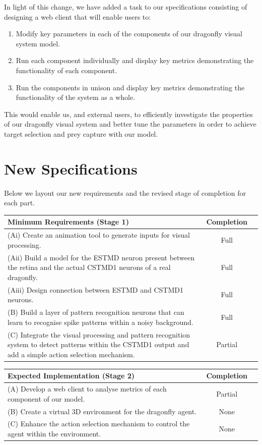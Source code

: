 \documentclass[a4paper,11pt]{article}
\begin{document}
In light of this change, we have added a task to our specifications consisting of designing a web client that will enable users to:
\begin{enumerate}
	\item Modify key parameters in each of the components of our dragonfly visual system model.
	\item Run each component individually and display key metrics demonstrating the functionality of each component.
	\item Run the components in unison and display key metrics demonstrating the functionality of the system as a whole.
\end{enumerate}
This would enable us, and external users, to efficiently investigate the properties of our dragonfly visual system and better tune the parameters in order to achieve target selection and prey capture with our model.

\section{New Specifications}
Below we layout our new requirements and the revised stage of completion for each part.
\begin{center}
    \begin{tabular}{p{12cm} c c}
    \textbf{Minimum Requirements (Stage 1)} & \textbf{Completion} \\ \hline
    (Ai) Create an animation tool to generate inputs for visual processing. & Full \\ 
	(Aii) Build a model for the ESTMD neuron present between the retina and the actual CSTMD1 neurons of a real dragonfly. & Full \\
	(Aiii) Design connection between ESTMD and CSTMD1 neurons. & Full \\
	(B) Build a layer of pattern recognition neurons that can learn to recognise spike patterns within a noisy background. & Full\\
	(C) Integrate the visual processing and pattern recognition system to detect patterns within the CSTMD1 output and add a simple action selection mechanism. & Partial\\
    \end{tabular}
\end{center}

\begin{center}
    \begin{tabular}{p{12cm} c c}
    \textbf{Expected Implementation (Stage 2)} & \textbf{Completion} \\ \hline
	(A) Develop a web client to analyse metrics of each component of our model. & Partial \\
	(B) Create a virtual 3D environment for the dragonfly agent. & None\\
	(C) Enhance the action selection mechanism to control the agent within the environment. & None\\
    \end{tabular}
\end{center}
\end{document}
